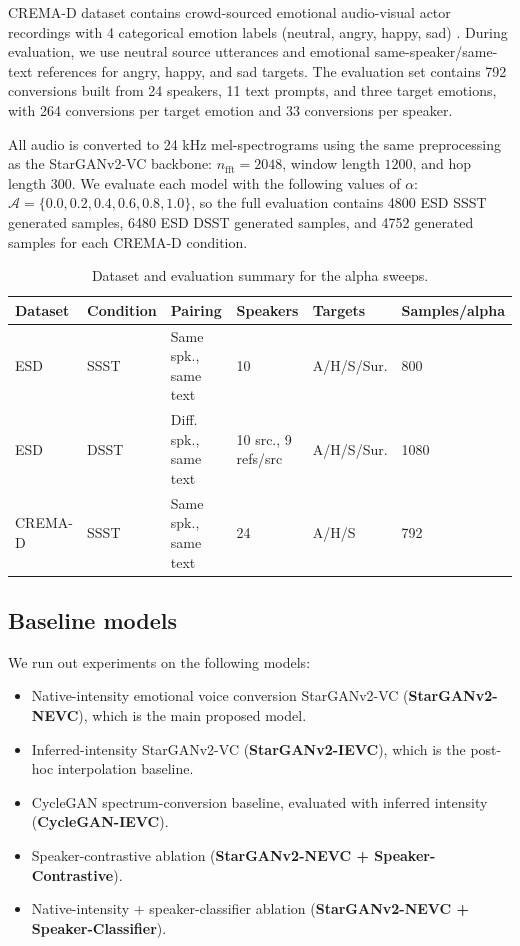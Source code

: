 CREMA-D dataset contains crowd-sourced emotional audio-visual actor recordings with 4 categorical emotion labels (neutral, angry, happy, sad) \cite{cao2014cremad}. During evaluation, we use neutral source utterances and emotional same-speaker/same-text references for angry, happy, and sad targets.
The evaluation set contains 792 conversions  built from 24 speakers, 11 text prompts, and three target emotions, with 264 conversions per target emotion and 33 conversions per speaker.

All audio is converted to 24 kHz mel-spectrograms using the same preprocessing as the StarGANv2-VC backbone: $n_{\mathrm{fft}}=2048$, window length $1200$, and hop length $300$. We evaluate each model with the following values of $\alpha$: $\mathcal{A}=\{0.0,0.2,0.4,0.6,0.8,1.0\}$, so the full  evaluation contains 4800 ESD SSST generated samples, 6480 ESD DSST generated samples, and 4752 generated samples for each CREMA-D condition.

\begin{table}[t]
\caption{Dataset and evaluation summary for the alpha sweeps.}
\label{tab:datasets}
\centering
\footnotesize
\begin{tabular}{@{}llllll@{}}
\toprule
Dataset & Condition & Pairing & Speakers & Targets & Samples/alpha \\
\midrule
ESD & SSST & Same spk., same text & 10 & A/H/S/Sur. & 800 \\
ESD & DSST & Diff. spk., same text & 10 src., 9 refs/src & A/H/S/Sur. & 1080 \\
CREMA-D & SSST & Same spk., same text & 24 & A/H/S & 792 \\
\bottomrule
\end{tabular}
\end{table}

\subsection{Baseline models}
We run out experiments on the following models:
\begin{itemize}
    \item Native-intensity emotional voice conversion StarGANv2-VC (\textbf{StarGANv2-NEVC}), which is the main proposed model.
    \item Inferred-intensity StarGANv2-VC (\textbf{StarGANv2-IEVC}), which is the post-hoc interpolation baseline.
    \item CycleGAN spectrum-conversion baseline, evaluated with inferred intensity (\textbf{CycleGAN-IEVC}).
    \item Speaker-contrastive ablation (\textbf{StarGANv2-NEVC + Speaker-Contrastive}).
    \item Native-intensity + speaker-classifier ablation (\textbf{StarGANv2-NEVC + Speaker-Classifier}).
\end{itemize}


